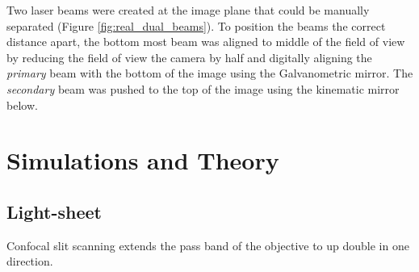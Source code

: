 Two laser beams were created at the image plane that could be manually separated (Figure \ref{fig:real_dual_beams}).
To position the beams the correct distance apart, the bottom most beam was aligned to middle of the field of view by reducing the field of view the camera by half and digitally aligning the \emph{primary} beam with the bottom of the image using the Galvanometric mirror.
The \emph{secondary} beam was pushed to the top of the image using the kinematic mirror below.

%  
%  

\section{Simulations and Theory}
\subsection{Light-sheet}

Confocal slit scanning extends the pass band of the objective to up double in one direction.

